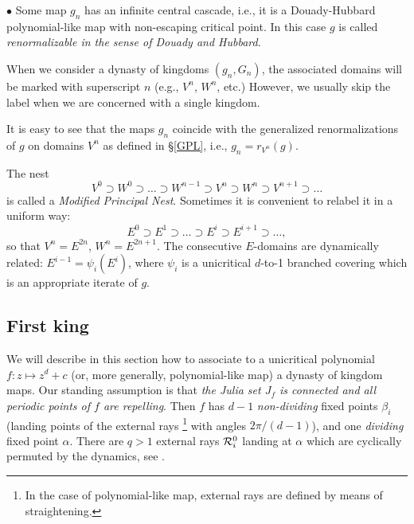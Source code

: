 \ssk\nin $\bullet$
 Some map $g_n$ has an infinite central cascade, i.e.,
 it is a Douady-Hubbard polynomial-like map \cite{DH}
with non-escaping critical point.
In this case $g$ is called {\it renormalizable in the sense of Douady and Hubbard}.  

\ssk
When we consider a dynasty of kingdoms $(g_n, G_n)$,  the associated domains will be marked with
superscript $n$ (e.g., $V^n$, $W^n$, etc.) 
However, we usually skip the label when we are concerned with a single kingdom.

  It is easy to see that the maps $g_n$ coincide with the generalized renormalizations of $g$ on
domains $V^n$ as defined in \S \ref{GPL}, i.e., $g_n= r_{V^n} (g)$. 



The nest 
$$
  V^0\supset W^0\supset \dots\supset    W^{n-1} \supset   V^n \supset W^n \supset V^{n+1}\supset\dots
$$
is called a {\it Modified Principal Nest}. 
Sometimes it is convenient to relabel it  in a uniform way: 
\begin{equation}\label{E}
  E^0\supset E^1\supset  \dots \supset  E^i \supset E^{i+1} \supset\dots,
\end{equation}
so that $V^n=E^{2n}$, $W^n= E^{2n+1}$. 
The consecutive $E$-domains are dynamically related: $E^{i-1}= \psi_i(E^i)$, 
where $\psi_i$ is a unicritical $d$-to-1 branched covering which is an appropriate iterate of $g$.

  

\subsection{First king}\label{sec: first king}
We will describe in this section how to  associate to a unicritical polynomial $f:z\mapsto z^d+c $ 
(or, more generally, polynomial-like map) a  dynasty of kingdom maps.   
Our standing assumption is that {\it the Julia set $J_f$ is connected and all periodic points of $f$ are
repelling}.  Then $f$ has $d-1$ {\it non-dividing} fixed points $\beta_i$ (landing points of the external rays%
\footnote{In the case of polynomial-like map, external rays are defined by means of straightening.}
with angles $2\pi/(d-1)$), and one {\it dividing} fixed point $\alpha$. There are $q>1$ external rays ${\cal R}_i^0$ landing at 
$\alpha$ which are cyclically permuted by the dynamics, see \cite{M-rays}.

